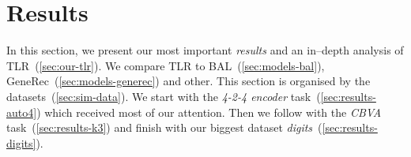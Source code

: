 

\section{Results} 
\label{sec:results} 

In this section, we present our most important \emph{results} and an in--depth analysis of TLR~(\ref{sec:our-tlr}). We compare TLR to BAL~(\ref{sec:models-bal}), GeneRec~(\ref{sec:models-generec}) and other. This section is organised by the datasets~(\ref{sec:sim-data}). We start with the \emph{4-2-4 encoder} task~(\ref{sec:results-auto4}) which received most of our attention. Then we follow with the \emph{CBVA} task~(\ref{sec:results-k3}) and finish with our biggest dataset \emph{digits}~(\ref{sec:results-digits}). 

 

 

 

 

